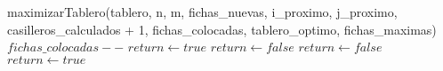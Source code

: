 \begin{algorithmic}[1]
			\State maximizarTablero(tablero, n, m, fichas\_nuevas, i\_proximo, j\_proximo, casilleros\_calculados + 1, fichas\_colocadas, tablero\_optimo, fichas\_maximas) \label{ej_3:pseudo:recursion}
				\State $fichas\_colocadas--$
			\EndIf
		\EndIf
	\EndFor \label{ej_3:pseudo:fichas_end}
	\EndProcedure
	\Statex
	 \label{ej_3:pseudo:validaColocar}
			\State $return \gets true$
		\EndIf
					\State $return \gets false$
				\EndIf
			\EndIf
		\EndIf
					\State $return \gets false$
				\EndIf
			\EndIf
		\EndIf
		\State $return \gets true$
	\EndProcedure
\end{algorithmic}

